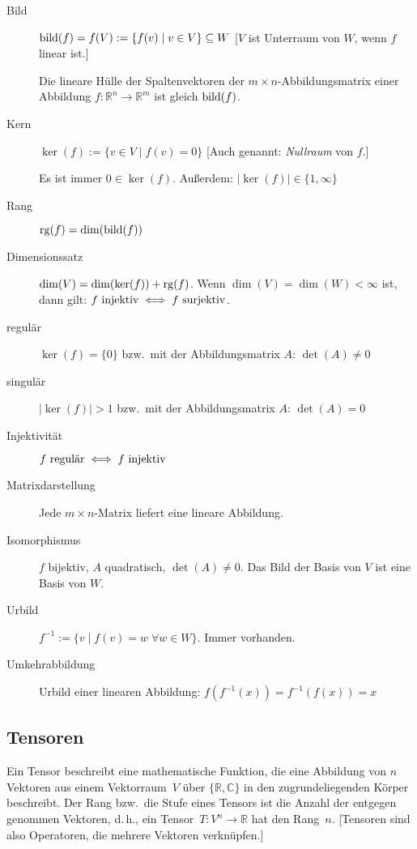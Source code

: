 \begin{description}
  \item [{Bild}] 
	$\operatorname{bild}(f) = f(V) := \{ f(v) \mid v \in V \} \subseteq W$
	[$V$ ist Unterraum von $W$, wenn $f$ linear ist.]

	Die lineare Hülle der Spaltenvektoren der $m\times n$-Abbildungsmatrix einer Abbildung $f:\mathbb{R}^{n}\to\mathbb{R}^{m}$ ist gleich $\operatorname{bild}(f)$.
  \item [{Kern}] 
	$\ker(f):=\{ v\in V \mid f(v)=0 \}$
    [Auch genannt: \emph{Nullraum} von $f$.]
    
    Es ist immer $0\in\ker(f)$.
	Außerdem: $\lvert \ker(f) \rvert \in \{ 1,\infty\} $
  \item [{Rang}] 
	$\operatorname{rg}(f)=\dim(\operatorname{bild}(f))$
  \item [{Dimensionssatz}] 
	$\dim(V)=\dim(\ker(f))+\operatorname{rg}(f)$.
    Wenn $\dim(V)=\dim(W)<\infty$ ist, dann gilt: $f \hbox{ injektiv} \iff f \hbox{ surjektiv}$.
  \item [{regulär}] 
	$\ker(f)=\{0\}$ bzw.~mit der Abbildungsmatrix $A$: $\det(A)\neq0$
  \item [{singulär}] 
	$\lvert \ker(f) \rvert > 1$ bzw.~mit der Abbildungsmatrix $A$: $\det(A)=0$
  \item [{Injektivität}]
	$f \hbox{ regulär} \iff f \hbox{ injektiv}$
  \item [{Matrixdarstellung}]
	Jede $m\times n$-Matrix liefert eine lineare Abbildung.
  \item [{Isomorphismus}]
	$f$ bijektiv, $A$ quadratisch, $\det(A)\neq0$. Das Bild der Basis von $V$ ist eine Basis von $W$.
  \item [{Urbild}] 
	$f^{-1}:=\{ v \mid f(v)=w\;\forall w\in W\} $. Immer vorhanden.
  \item [{Umkehrabbildung}] 
	Urbild einer linearen Abbildung: $f(f^{-1}(x))=f^{-1}(f(x))=x$
\end{description}

\subsection{Tensoren}
Ein Tensor beschreibt eine mathematische Funktion, die eine Abbildung von $n$ Vektoren aus einem Vektorraum~$V$ über $\{\mathbb{R}, \mathbb{C}\}$ in den zugrundeliegenden Körper beschreibt. Der Rang bzw.~die Stufe eines Tensors ist die Anzahl der entgegen genommen Vektoren, d.\,h., ein Tensor~$T : V^n \to \mathbb{R}$ hat den Rang~$n$. [Tensoren sind also Operatoren, die mehrere Vektoren verknüpfen.]

